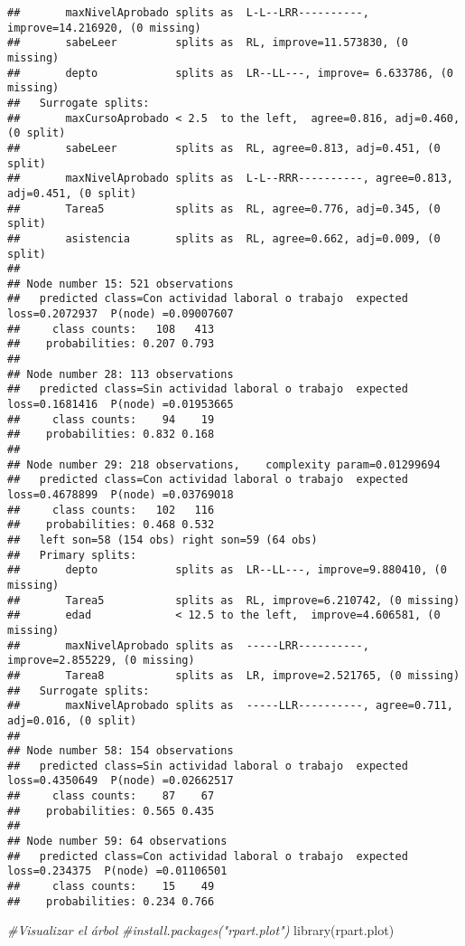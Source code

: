 \documentclass[
]{article}
\newenvironment{Shaded}{\begin{snugshade}}{\end{snugshade}}
\newcommand{\CommentTok}[1]{\textcolor[rgb]{0.56,0.35,0.01}{\textit{#1}}}
\newcommand{\FunctionTok}[1]{\textcolor[rgb]{0.00,0.00,0.00}{#1}}
\newcommand{\NormalTok}[1]{#1}
\begin{document}
\begin{verbatim}
##       maxNivelAprobado splits as  L-L--LRR----------, improve=14.216920, (0 missing)
##       sabeLeer         splits as  RL, improve=11.573830, (0 missing)
##       depto            splits as  LR--LL---, improve= 6.633786, (0 missing)
##   Surrogate splits:
##       maxCursoAprobado < 2.5  to the left,  agree=0.816, adj=0.460, (0 split)
##       sabeLeer         splits as  RL, agree=0.813, adj=0.451, (0 split)
##       maxNivelAprobado splits as  L-L--RRR----------, agree=0.813, adj=0.451, (0 split)
##       Tarea5           splits as  RL, agree=0.776, adj=0.345, (0 split)
##       asistencia       splits as  RL, agree=0.662, adj=0.009, (0 split)
## 
## Node number 15: 521 observations
##   predicted class=Con actividad laboral o trabajo  expected loss=0.2072937  P(node) =0.09007607
##     class counts:   108   413
##    probabilities: 0.207 0.793 
## 
## Node number 28: 113 observations
##   predicted class=Sin actividad laboral o trabajo  expected loss=0.1681416  P(node) =0.01953665
##     class counts:    94    19
##    probabilities: 0.832 0.168 
## 
## Node number 29: 218 observations,    complexity param=0.01299694
##   predicted class=Con actividad laboral o trabajo  expected loss=0.4678899  P(node) =0.03769018
##     class counts:   102   116
##    probabilities: 0.468 0.532 
##   left son=58 (154 obs) right son=59 (64 obs)
##   Primary splits:
##       depto            splits as  LR--LL---, improve=9.880410, (0 missing)
##       Tarea5           splits as  RL, improve=6.210742, (0 missing)
##       edad             < 12.5 to the left,  improve=4.606581, (0 missing)
##       maxNivelAprobado splits as  -----LRR----------, improve=2.855229, (0 missing)
##       Tarea8           splits as  LR, improve=2.521765, (0 missing)
##   Surrogate splits:
##       maxNivelAprobado splits as  -----LLR----------, agree=0.711, adj=0.016, (0 split)
## 
## Node number 58: 154 observations
##   predicted class=Sin actividad laboral o trabajo  expected loss=0.4350649  P(node) =0.02662517
##     class counts:    87    67
##    probabilities: 0.565 0.435 
## 
## Node number 59: 64 observations
##   predicted class=Con actividad laboral o trabajo  expected loss=0.234375  P(node) =0.01106501
##     class counts:    15    49
##    probabilities: 0.234 0.766
\end{verbatim}

\begin{Shaded}
\begin{Highlighting}[]
\CommentTok{\#Visualizar el árbol}
\CommentTok{\#install.packages("rpart.plot")}
\FunctionTok{library}\NormalTok{(rpart.plot)}
\end{Highlighting}
\end{Shaded}
\end{document}

